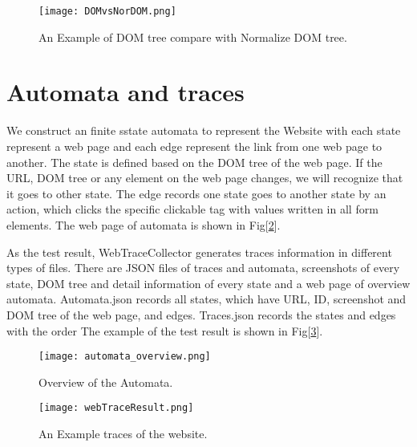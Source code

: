 
\begin{figure}[h]
	\graphicspath{{pic/}}
	\begin{center}
		\texttt{[image: DOMvsNorDOM.png]}
	\end{center}
	\caption{An Example of DOM tree compare with Normalize DOM tree. }
	\label{DOMvsNorDOM}
\end{figure}

\clearpage

\section{Automata and traces}

We construct an finite sstate automata to represent the Website 
with each state represent a web page and each edge represent the link from one web page to another.
The state is defined based on the DOM tree of the web page.
If the URL, DOM tree or any element on the web page changes, we will recognize that it goes to other state.
The edge records one state goes to another state by an action,
which clicks the specific clickable tag with values written in all form elements.
The web page of automata is shown in Fig[\ref{AutomataOverview}].

As the test result, WebTraceCollector generates traces information in different types of files. 
There are JSON files of traces and automata, screenshots of every state, DOM tree and detail information of every state and a web page of overview automata.
Automata.json records all states, which have URL, ID, screenshot and DOM tree of the web page, and edges.
Traces.json records the states and edges with the order
The example of the test result is shown in Fig[\ref{TestResult}].

\clearpage

\begin{figure}[h]
	\graphicspath{{pic/}}
	\begin{center}
		\texttt{[image: automata\_overview.png]}
	\end{center}
	\caption{ Overview of the Automata. }
	\label{AutomataOverview}
\end{figure}

\begin{figure}[h]
	\graphicspath{{pic/}}
	\begin{center}
		\texttt{[image: webTraceResult.png]}
	\end{center}
	\caption{An Example traces of the website. }
	\label{TestResult}
\end{figure}

